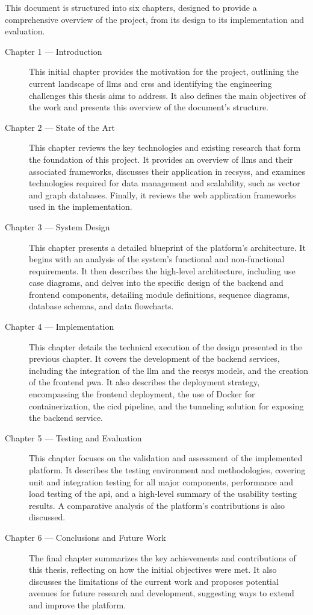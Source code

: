 This document is structured into six chapters, designed to provide a comprehensive overview of the project, from its design to its implementation and evaluation.

\begin{description}
    \item[Chapter 1 --- Introduction] This initial chapter provides the motivation for the project, outlining the current landscape of \acp{llm} and \acp{crs} and identifying the engineering challenges this thesis aims to address. It also defines the main objectives of the work and presents this overview of the document's structure.

    \item[Chapter 2 --- State of the Art] This chapter reviews the key technologies and existing research that form the foundation of this project. It provides an overview of \acp{llm} and their associated frameworks, discusses their application in \acl{recsys}s, and examines technologies required for data management and scalability, such as vector and graph databases. Finally, it reviews the web application frameworks used in the implementation.

    \item[Chapter 3 --- System Design] This chapter presents a detailed blueprint of the platform's architecture. It begins with an analysis of the system's functional and non-functional requirements. It then describes the high-level architecture, including use case diagrams, and delves into the specific design of the backend and frontend components, detailing module definitions, sequence diagrams, database schemas, and data flowcharts.

    \item[Chapter 4 --- Implementation] This chapter details the technical execution of the design presented in the previous chapter. It covers the development of the backend services, including the integration of the \ac{llm} and the \acs{recsys} models, and the creation of the frontend \ac{pwa}. It also describes the deployment strategy, encompassing the frontend deployment, the use of Docker for containerization, the \ac{cicd} pipeline, and the tunneling solution for exposing the backend service.

    \item[Chapter 5 --- Testing and Evaluation] This chapter focuses on the validation and assessment of the implemented platform. It describes the testing environment and methodologies, covering unit and integration testing for all major components, performance and load testing of the \acs{api}, and a high-level summary of the usability testing results. A comparative analysis of the platform's contributions is also discussed.

    \item[Chapter 6 --- Conclusions and Future Work] The final chapter summarizes the key achievements and contributions of this thesis, reflecting on how the initial objectives were met. It also discusses the limitations of the current work and proposes potential avenues for future research and development, suggesting ways to extend and improve the platform.
\end{description}
